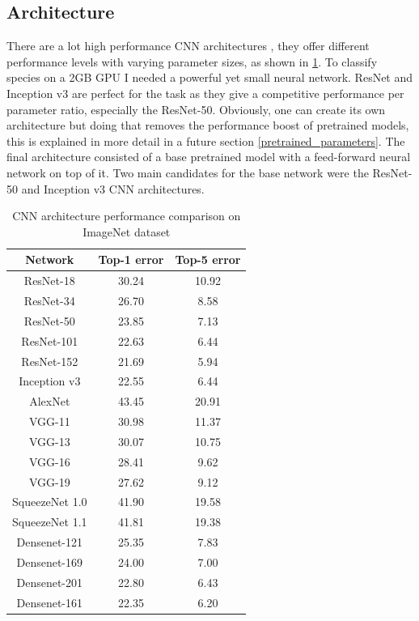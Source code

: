 \documentclass[times, utf8, diplomski]{fer}
\begin{document}
\subsection{Architecture}
\label{se:architecture}

There are a lot high performance CNN architectures \citep{he_deep_2016, simonyan_very_2014, szegedy_going_2015}, they offer different performance levels with varying parameter sizes, as shown in \ref{tb:CNN_architecutre_performance}. To classify species on a 2GB GPU I needed a powerful yet small neural network. ResNet and Inception v3 are perfect for the task as they give a competitive performance per parameter ratio, especially the ResNet-50. Obviously, one can create its own architecture but doing that removes the performance boost of pretrained models, this is explained in more detail in a future section \ref{pretrained_parameters}. The final architecture consisted of a base pretrained model with a feed-forward neural network on top of it. Two main candidates for the base network were the ResNet-50 and Inception v3 CNN architectures.

\begin{table}
\centering
\caption{CNN architecture performance comparison on ImageNet dataset}
\label{tb:CNN_architecutre_performance}
\begin{tabular}{ccc}
\hline 
Network	& Top-1 error & Top-5 error \\  \hline
ResNet-18 & 30.24 & 10.92 \\
ResNet-34 & 26.70 & 8.58 \\ 
ResNet-50 & 23.85 & 7.13 \\ 
ResNet-101 & 22.63 & 6.44 \\ 
ResNet-152 & 21.69 & 5.94 \\  \hline
Inception v3 & 22.55 & 6.44 \\  \hline
AlexNet & 43.45 & 20.91 \\  \hline
VGG-11 & 30.98 & 11.37 \\ 
VGG-13 & 30.07 & 10.75 \\ 
VGG-16 & 28.41 & 9.62 \\ 
VGG-19 & 27.62 & 9.12 \\  \hline
SqueezeNet 1.0 & 41.90 & 19.58 \\ 
SqueezeNet 1.1 & 41.81 & 19.38 \\  \hline
Densenet-121 & 25.35 & 7.83 \\ 
Densenet-169 & 24.00 & 7.00 \\ 
Densenet-201 & 22.80 & 6.43 \\ 
Densenet-161 & 22.35 & 6.20 \\ 
\hline 
\end{tabular} 
\end{table}
\end{document}
